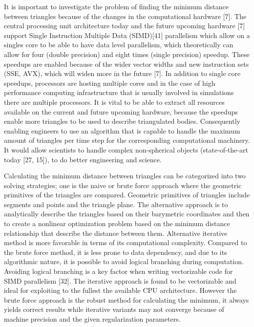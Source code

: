 \documentclass[times,12pt]{ACME2015article}
\begin{document}
It is important to investigate the problem of finding the minimum distance between triangles because of the changes in the computational hardware [7]. The central processing unit architecture today and the future upcoming hardware [7] support Single Instruction Multiple Data (SIMD)[41] parallelism which allow on a singles core to be able to have data level parallelism, which theoretically can allow for four (double precision) and eight times (single precision) speedup. These speedups are enabled because of the wider vector widths and new instruction sets (SSE, AVX), which will widen more in the future [7]. In addition to single core speedups, processors are hosting multiple cores and in the case of high performance computing infrastructure that is usually involved in simulations there are multiple processors. It is vital to be able to extract all resources available on the current and future upcoming hardware, because the speedups enable more triangles to be used to describe triangulated bodies. Consequently enabling engineers to use an algorithm that is capable to handle the maximum amount of triangles per time step for the corresponding computational machinery. It would allow scientists to handle complex non-spherical objects (state-of-the-art today [27, 15]), to do better engineering and science.

Calculating the minimum distance between triangles can be categorized into two solving strategies; one is the naive or brute force approach where the geometric primitives of the triangles are compared. Geometric primitives of triangles include segments and points and the triangle plane. The alternative approach is to analytically describe the triangles based on their barymetric coordinates and then to create a nonlinear optimization problem based on the minimum distance relationship that describe the distance between them. Alternative iterative method is more favorable in terms of its computational complexity. Compared to the brute force method, it is less prone to data dependency, and due to its algorithmic nature, it is possible to avoid logical branching during computation. Avoiding logical branching is a key factor when writing vectorizable code for SIMD parallelism [32]. The iterative approach is found to be vectorizable and ideal for exploiting to the fullest the available CPU architecture. However the brute force approach is the robust method for calculating the minimum, it always yields correct results while iterative variants may not converge because of machine precision and the given regularization parameters.
\end{document}
